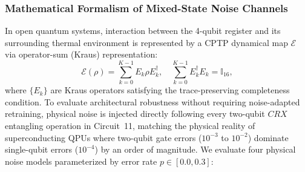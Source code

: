 \documentclass[journal]{IEEEtran}
\begin{document}
\subsubsection{Mathematical Formalism of Mixed-State Noise Channels}
In open quantum systems, interaction between the 4-qubit register and its surrounding thermal environment is represented by a CPTP dynamical map $\mathcal{E}$ via operator-sum (Kraus) representation:
\begin{equation}
\mathcal{E}(\rho) = \sum_{k=0}^{K-1} E_k \rho E_k^\dagger, \quad \sum_{k=0}^{K-1} E_k^\dagger E_k = \mathbb{I}_{16},
\label{eq:cptp_general}
\end{equation}
where $\{E_k\}$ are Kraus operators satisfying the trace-preserving completeness condition. To evaluate architectural robustness without requiring noise-adapted retraining, physical noise is injected directly following every two-qubit $CRX$ entangling operation in Circuit~11, matching the physical reality of superconducting QPUs where two-qubit gate errors ($10^{-3}$ to $10^{-2}$) dominate single-qubit errors ($10^{-4}$) by an order of magnitude. We evaluate four physical noise models parameterized by error rate $p \in [0.0, 0.3]$:
\end{document}
